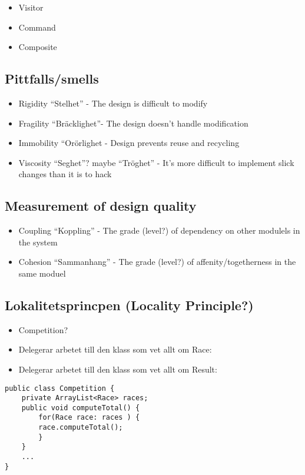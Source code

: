 \documentclass[11pt]{amsart}
\begin{document}
\begin{itemize}
  \item Visitor
  \item Command
  \item Composite
\end{itemize}

\subsection{Pittfalls/smells}
\begin{itemize}
  \item Rigidity ``Stelhet'' - The design is difficult to modify
  \item Fragility ``Bräcklighet''- The design doesn't handle modification
  \item Immobility ``Orörlighet - Design prevents reuse and recycling
  \item Viscosity ``Seghet''? maybe ``Tröghet'' - It's more difficult to
  implement slick changes than it is to hack
\end{itemize}

\subsection{Measurement of design quality}
\begin{itemize}
  \item Coupling ``Koppling'' - The grade (level?) of dependency on other
  modulels in the system
  \item Cohesion ``Sammanhang'' - The grade (level?) of affenity/togetherness in
  the same moduel 
\end{itemize}

\subsection{Lokalitetsprincpen (Locality Principle?)}
\begin{itemize}
  \item Competition? 
  \item Delegerar arbetet till den klass som vet allt om Race:
  \item Delegerar arbetet till den klass som vet allt om Result:
\end{itemize}
\begin{lstlisting}
public class Competition {
	private ArrayList<Race> races; 
	public void computeTotal() {
		for(Race race: races ) { 
		race.computeTotal();
		} 
	}	
	...
}
\end{lstlisting}
\end{document}
